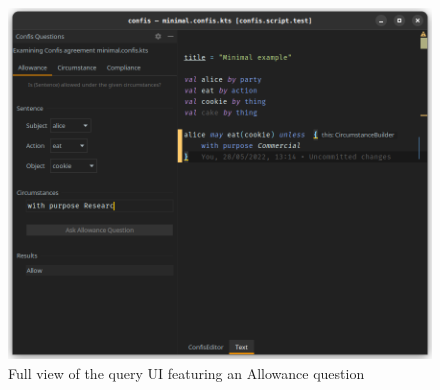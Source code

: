 \begin{figure}[h]
    \centering
    \includegraphics[width=\textwidth]{figures/queryUIWindow}
    \caption{Full view of the query UI featuring an Allowance question}
    \label{fig:queryUi-window}
\end{figure}

